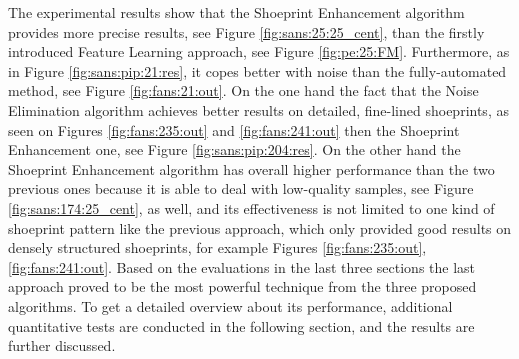 \documentclass[draft,final]{vutinfth} %
\begin{document}

\par
The experimental results show that the Shoeprint Enhancement algorithm provides more precise results, see Figure \ref{fig:sans:25:25_cent}, than the firstly introduced Feature Learning approach, see Figure \ref{fig:pe:25:FM}.
Furthermore, as in Figure \ref{fig:sans:pip:21:res}, it copes better with noise than the fully-automated method, see Figure \ref{fig:fans:21:out}.
On the one hand the fact that the Noise Elimination algorithm achieves better results on detailed, fine-lined shoeprints, as seen on Figures \ref{fig:fans:235:out} and \ref{fig:fans:241:out} then the Shoeprint Enhancement one, see Figure \ref{fig:sans:pip:204:res}.
On the other hand the Shoeprint Enhancement algorithm has overall higher performance than the two previous ones because it is able to deal with low-quality samples, see Figure \ref{fig:sans:174:25_cent}, as well, and its effectiveness is not limited to one kind of shoeprint pattern like the previous approach, which only provided good results on densely structured shoeprints, for example Figures \ref{fig:fans:235:out}, \ref{fig:fans:241:out}. 
Based on the evaluations in the last three sections the last approach proved to be the most powerful technique from the three proposed algorithms.
To get a detailed overview about its performance, additional quantitative tests are conducted in the following section, and the results are further discussed.
\end{document}
